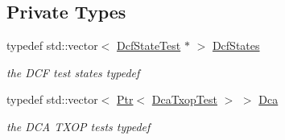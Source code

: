 \subsection*{Private Types}
\begin{DoxyCompactItemize}
\item 
typedef std\+::vector$<$ \hyperlink{classDcfStateTest}{Dcf\+State\+Test} $\ast$ $>$ \hyperlink{classDcfManagerTest_a93260b3e7b9c75933d1cfbce5c2999a8}{Dcf\+States}
\begin{DoxyCompactList}\small\item\em the D\+CF test states typedef \end{DoxyCompactList}\item 
typedef std\+::vector$<$ \hyperlink{classns3_1_1Ptr}{Ptr}$<$ \hyperlink{classDcaTxopTest}{Dca\+Txop\+Test} $>$ $>$ \hyperlink{classDcfManagerTest_a06a5dafa891e87d80692c47eac2ce4b3}{Dca}
\begin{DoxyCompactList}\small\item\em the D\+CA T\+X\+OP tests typedef \end{DoxyCompactList}\end{DoxyCompactItemize}
